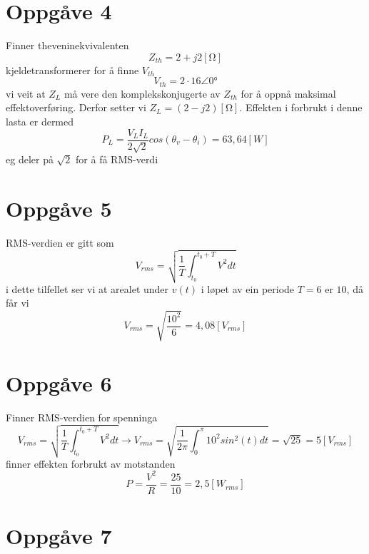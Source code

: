 \documentclass[12pt,a4paper]{article}
\begin{document}
  \section*{Oppgåve 4}
    Finner theveninekvivalenten
    \begin{equation}
      Z_{th} = 2+j2[\si{\ohm}]
    \end{equation}
    kjeldetransformerer for å finne $V_{th}$
    \begin{equation}
      V_{th} = 2\cdot 16\angle \ang{0}
    \end{equation}
    vi veit at $Z_L$ må vere den komplekskonjugerte av $Z_{th}$ for å oppnå
    maksimal effektoverføring. Derfor setter vi $Z_L = (2-j2)[\si{\ohm}]$. Effekten i forbrukt
    i denne lasta er dermed 
    \begin{equation}
      P_L = \frac{V_L I_L}{2\sqrt{2}} cos(\theta_v - \theta_i) = 63,64 [W]
    \end{equation}
    eg deler på $\sqrt{2}$ for å få RMS-verdi

  \section*{Oppgåve 5}
    RMS-verdien er gitt som
    \begin{equation}
      V_{rms} = \sqrt{\frac{1}{T} \int_{t_0}^{t_0 + T} V^2 dt}
    \end{equation}
    i dette tilfellet ser vi at arealet under $v(t)$ i løpet av ein periode $T=6$ er $10$,
    då får vi
    \begin{equation}
      V_{rms} = \sqrt{\frac{10^2}{6}} = 4,08 [V_{rms}]
    \end{equation}


  \section*{Oppgåve 6}
    Finner RMS-verdien for spenninga
    \begin{equation}
      V_{rms} = \sqrt{\frac{1}{T} \int_{t_0}^{t_0 + T} V^2 dt}
      \rightarrow
      V_{rms} = \sqrt{\frac{1}{2\pi} \int_{0}^{\pi} 10^2sin^2(t)dt} = \sqrt{25} = 5 [V_{rms}]
    \end{equation}
    finner effekten forbrukt av motstanden
    \begin{equation}
      P = \frac{V^2}{R} = \frac{25}{10} = 2,5 [W_{rms}]
    \end{equation}


  \section*{Oppgåve 7}
\end{document}
